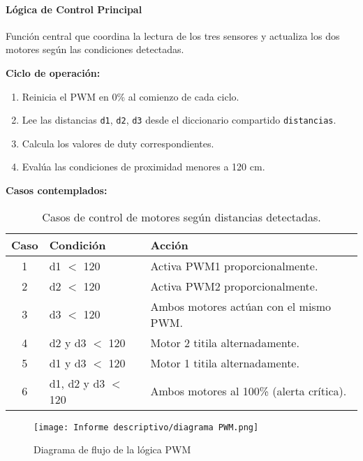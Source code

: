\documentclass[12pt,a4paper]{article}
\begin{document}
\paragraph{Lógica de Control Principal}
\begin{itemize}

Función central que coordina la lectura de los tres sensores y actualiza los dos motores según las condiciones detectadas.

\textbf{Ciclo de operación:}

\begin{enumerate}
    \item Reinicia el PWM en 0\% al comienzo de cada ciclo.  
    \item Lee las distancias \texttt{d1}, \texttt{d2}, \texttt{d3} desde el diccionario compartido \texttt{distancias}.  
    \item Calcula los valores de duty correspondientes.  
    \item Evalúa las condiciones de proximidad menores a 120 cm.  
\end{enumerate}

\textbf{Casos contemplados:}

\begin{table}[H]
\centering
\begin{tabular}{|c|p{5cm}|p{7cm}|}
\hline
\textbf{Caso} & \textbf{Condición} & \textbf{Acción} \\ \hline
1 & d1 $<$ 120 & Activa PWM1 proporcionalmente. \\ \hline
2 & d2 $<$ 120 & Activa PWM2 proporcionalmente. \\ \hline
3 & d3 $<$ 120 & Ambos motores actúan con el mismo PWM. \\ \hline
4 & d2 y d3 $<$ 120 & Motor 2 titila alternadamente. \\ \hline
5 & d1 y d3 $<$ 120 & Motor 1 titila alternadamente. \\ \hline
6 & d1, d2 y d3 $<$ 120 & Ambos motores al 100\% (alerta crítica). \\ \hline
\end{tabular}
\caption{Casos de control de motores según distancias detectadas.}
\end{table}
\end{itemize}

\begin{figure}[H]
    \centering
    \texttt{[image: Informe descriptivo/diagrama PWM.png]}
    \caption{Diagrama de flujo de la lógica PWM}
\end{figure}
\end{document}
